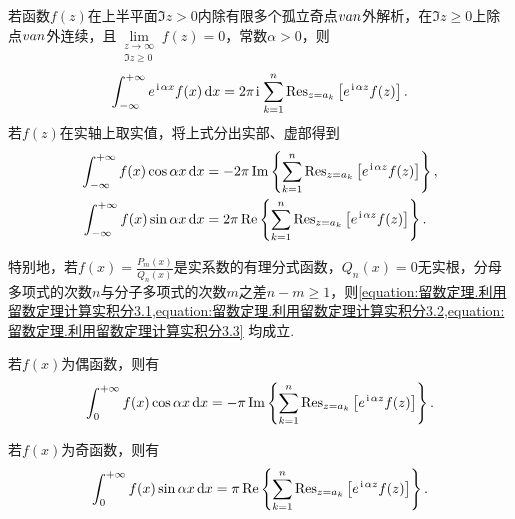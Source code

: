 \begin{theorem}\label{theorem:留数定理.利用留数定理计算实积分3}
若函数\(f(z)\)在上半平面\(\Im z > 0\)内除有限多个孤立奇点\(v{a}{n}\)外解析，在\(\Im z \geqslant 0\)上除点\(v{a}{n}\)外连续，且\(\lim\limits_{\substack{z\to\infty \\ \Im z \geqslant 0}} f(z) = 0\)，常数\(\alpha>0\)，则\begin{equation}\label{equation:留数定理.利用留数定理计算实积分3.1}
\int_{-\infty}^{+\infty} e^{\kern1pt\mathrm{i}\kern1pt\alpha x} f(x) \dd{x}
= 2\pi\kern1pt\mathrm{i}\kern1pt \sum\limits_{k=1}^n \operatorname{Res}_{z=a_k} \left[e^{\kern1pt\mathrm{i}\kern1pt\alpha z} f(z)\right].
\end{equation}
若\(f(z)\)在实轴上取实值，将上式分出实部、虚部得到\begin{align}
\int_{-\infty}^{+\infty} f(x) \cos\alpha x \dd{x}
&= -2\pi \Im\left\{ \sum\limits_{k=1}^n \operatorname{Res}_{z=a_k} \left[e^{\kern1pt\mathrm{i}\kern1pt\alpha z} f(z)\right] \right\}, \label{equation:留数定理.利用留数定理计算实积分3.2} \\
\int_{-\infty}^{+\infty} f(x) \sin\alpha x \dd{x}
&= 2\pi \Re\left\{ \sum\limits_{k=1}^n \operatorname{Res}_{z=a_k} \left[e^{\kern1pt\mathrm{i}\kern1pt\alpha z} f(z)\right] \right\}. \label{equation:留数定理.利用留数定理计算实积分3.3}
\end{align}

特别地，若\(f(x) = \frac{P_m(x)}{Q_n(x)}\)是实系数的有理分式函数，\(Q_n(x)=0\)无实根，分母多项式的次数\(n\)与分子多项式的次数\(m\)之差\(n-m\geqslant1\)，则\cref{equation:留数定理.利用留数定理计算实积分3.1,equation:留数定理.利用留数定理计算实积分3.2,equation:留数定理.利用留数定理计算实积分3.3} 均成立.

若\(f(x)\)为偶函数，则有\begin{equation}\label{theorem:留数定理.利用留数定理计算实积分3.4}
\int_0^{+\infty} f(x) \cos\alpha x \dd{x}
= -\pi \Im\left\{ \sum\limits_{k=1}^n \operatorname{Res}_{z=a_k} \left[e^{\kern1pt\mathrm{i}\kern1pt\alpha z} f(z)\right] \right\}.
\end{equation}

若\(f(x)\)为奇函数，则有\begin{equation}\label{theorem:留数定理.利用留数定理计算实积分3.5}
\int_0^{+\infty} f(x) \sin\alpha x \dd{x}
= \pi \Re\left\{ \sum\limits_{k=1}^n \operatorname{Res}_{z=a_k} \left[e^{\kern1pt\mathrm{i}\kern1pt\alpha z} f(z)\right] \right\}.
\end{equation}
\end{theorem}

